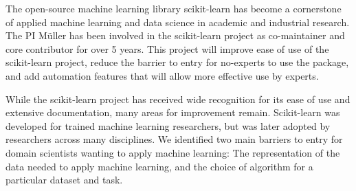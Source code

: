 \vspace{-2mm}
\vspace{-2mm}
The open-source machine learning library scikit-learn has become a cornerstone of
applied machine learning and data science in academic and industrial research.
The PI M\"uller has been involved in the scikit-learn project as co-maintainer
and core contributor for over 5 years. This project will improve ease of use of the
scikit-learn project, reduce the barrier to entry for no-experts to use the package,
and add automation features that will allow more effective use by experts.

While the scikit-learn project has received wide recognition for its ease of
use and extensive documentation, many areas for improvement remain.
Scikit-learn was developed for trained machine learning researchers,
but was later adopted by researchers across many disciplines.
We identified two main barriers to entry for domain scientists wanting to apply
machine learning:
The representation of the data needed to apply machine learning, and the choice
of algorithm for a particular dataset and task.


